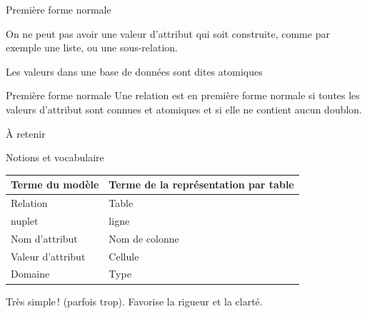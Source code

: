 \begin{frame}{Première forme normale}

 On \alert{ne peut
pas} avoir une valeur d'attribut qui soit construite, comme par
exemple une liste, ou une sous-relation. 

\vfill

Les valeurs dans une base de données sont dites \alert{atomiques} 

\vfill

\begin{defblock}{Première forme normale}
Une relation est en première forme normale si toutes les valeurs d'attribut sont connues et atomiques
et si elle ne contient aucun doublon.
\end{defblock}

\end{frame}



\begin{frame}{À retenir}

\alert{Notions et vocabulaire}

\vfill

\begin{tabular}{l|l}
\textbf{Terme du modèle} & \textbf{Terme de la représentation par table}\\ \hline
 Relation& Table\\
   nuplet& ligne\\
   Nom d'attribut &Nom de colonne\\
   Valeur d'attribut& Cellule\\
   Domaine&Type\\
\hline
\end{tabular}

\vfill

\alert{Très simple\,!} (parfois trop). Favorise la rigueur et la clarté.
\end{frame}

